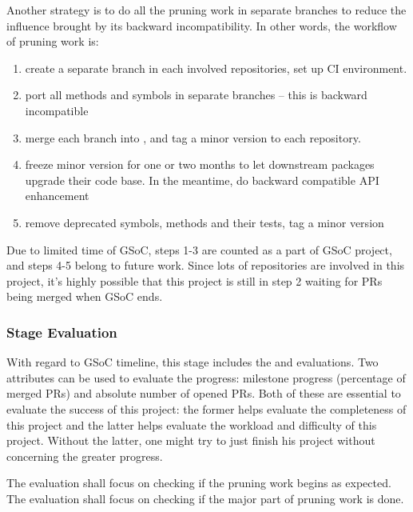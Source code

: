 Another strategy is to do all the pruning work in separate branches to reduce the influence brought by its backward incompatibility. In other words, the workflow of pruning work is:
\begin{enumerate}
    \item create a separate branch  in each involved repositories, set up CI environment.
    \item port all methods and symbols in separate branches -- this is backward incompatible
    \item merge each branch into , and tag a minor version to each repository.
    \item freeze minor version for one or two months to let downstream packages upgrade their code base. In the meantime, do backward compatible API enhancement
    \item remove deprecated symbols, methods and their tests, tag a minor version
\end{enumerate}
Due to limited time of GSoC, steps 1-3 are counted as a part of GSoC project, and steps 4-5 belong to future work. Since lots of repositories are involved in this project, it's highly possible that this project is still in step 2 waiting for PRs being merged when GSoC ends.\par


\subsubsection*{Stage Evaluation}

With regard to GSoC timeline, this stage includes the  and  evaluations. Two attributes can be used to evaluate the progress: milestone progress (percentage of merged PRs) and absolute number of opened PRs. Both of these are essential to evaluate the success of this project: the former helps evaluate the completeness of this project and the latter helps evaluate the workload and difficulty of this project. Without the latter, one might try to just finish his project without concerning the greater \images{}  progress. \par

The  evaluation shall focus on checking if the pruning work begins as expected. The  evaluation shall focus on checking if the major part of pruning work is done.
